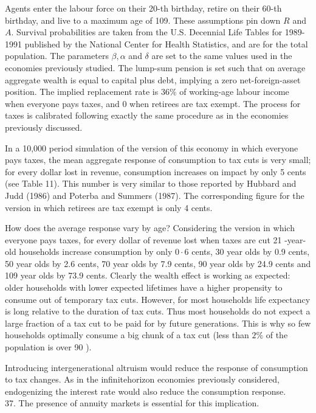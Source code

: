 \documentclass[11pt]{article}
\begin{document}
Agents enter the labour force on their 20-th birthday, retire on their 60-th birthday, and live to a maximum age of 109. These assumptions pin down $R$ and $A$. Survival probabilities are taken from the U.S. Decennial Life Tables for 1989-1991 published by the National Center for Health Statistics, and are for the total population. The parameters $\beta, \alpha$ and $\delta$ are set to the same values used in the economies previously studied. The lump-sum pension is set such that on average aggregate wealth is equal to capital plus debt, implying a zero net-foreign-asset position. The implied replacement rate is $36 \%$ of working-age labour income when everyone pays taxes, and 0 when retirees are tax exempt. The process for taxes is calibrated following exactly the same procedure as in the economies previously discussed.

In a 10,000 period simulation of the version of this economy in which everyone pays taxes, the mean aggregate response of consumption to tax cuts is very small; for every dollar lost in revenue, consumption increases on impact by only 5 cents (see Table 11). This number is very similar to those reported by Hubbard and Judd (1986) and Poterba and Summers (1987). The corresponding figure for the version in which retirees are tax exempt is only 4 cents.

How does the average response vary by age? Considering the version in which everyone pays taxes, for every dollar of revenue lost when taxes are cut 21 -year-old households increase consumption by only $0 \cdot 6$ cents, 30 year olds by 0.9 cents, 50 year olds by 2.6 cents, 70 year olds by 7.9 cents, 90 year olds by 24.9 cents and 109 year olds by 73.9 cents. Clearly the wealth effect is working as expected: older households with lower expected lifetimes have a higher propensity to consume out of temporary tax cuts. However, for most households life expectancy is long relative to the duration of tax cuts. Thus most households do not expect a large fraction of a tax cut to be paid for by future generations. This is why so few households optimally consume a big chunk of a tax cut (less than $2 \%$ of the population is over 90 ).

Introducing intergenerational altruism would reduce the response of consumption to tax changes. As in the infinitehorizon economies previously considered, endogenizing the interest rate would also reduce the consumption response.\\
37. The presence of annuity markets is essential for this implication.
\end{document}
